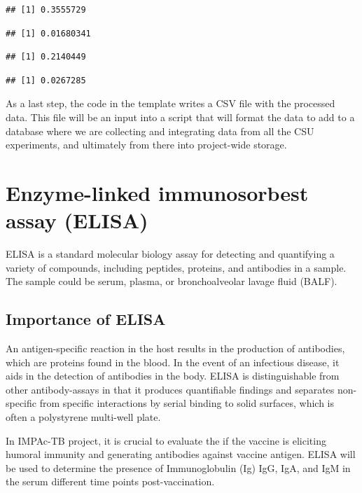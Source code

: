 \documentclass[
]{book}
\begin{document}
\begin{verbatim}
## [1] 0.3555729
\end{verbatim}

\begin{verbatim}
## [1] 0.01680341
\end{verbatim}

\begin{verbatim}
## [1] 0.2140449
\end{verbatim}

\begin{verbatim}
## [1] 0.0267285
\end{verbatim}

As a last step, the code in the template writes a CSV file with the processed
data. This file will be an input into a script that will format the data to
add to a database where we are collecting and integrating data from all the CSU
experiments, and ultimately from there into project-wide storage.

\chapter{Enzyme-linked immunosorbest assay (ELISA)}\label{enzyme-linked-immunosorbest-assay-elisa}

ELISA is a standard molecular biology assay for detecting and quantifying a
variety of compounds, including peptides, proteins, and antibodies in a sample.
The sample could be serum, plasma, or bronchoalveolar lavage fluid (BALF).

\section{\texorpdfstring{\textbf{Importance of ELISA}}{Importance of ELISA}}\label{importance-of-elisa}

An antigen-specific reaction in the host results in the production of antibodies, which are proteins found in the blood. In the event of an infectious disease,
it aids in the detection of antibodies in the body. ELISA is distinguishable from other antibody-assays in that it produces quantifiable findings and separates non-specific from specific interactions by serial binding to solid surfaces,
which is often a polystyrene multi-well plate.

In IMPAc-TB project, it is crucial to evaluate the if the vaccine is eliciting humoral immunity and generating antibodies against vaccine antigen. ELISA will
be used to determine the presence of Immunoglobulin (Ig) IgG, IgA, and IgM in
the serum different time points post-vaccination.
\end{document}
